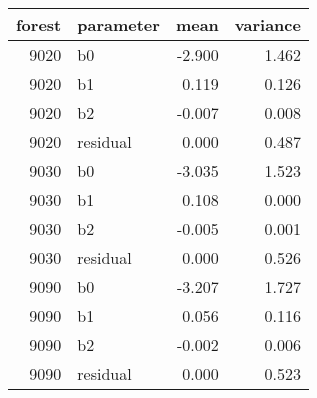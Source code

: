 \begin{table}[ht]
\begin{center}
\begin{tabular}{rlrr}
  \hline
forest & parameter & mean & variance \\ 
  \hline
9020 & b0 & -2.900 & 1.462 \\ 
  9020 & b1 & 0.119 & 0.126 \\ 
  9020 & b2 & -0.007 & 0.008 \\ 
  9020 & residual & 0.000 & 0.487 \\ 
  9030 & b0 & -3.035 & 1.523 \\ 
  9030 & b1 & 0.108 & 0.000 \\ 
  9030 & b2 & -0.005 & 0.001 \\ 
  9030 & residual & 0.000 & 0.526 \\ 
  9090 & b0 & -3.207 & 1.727 \\ 
  9090 & b1 & 0.056 & 0.116 \\ 
  9090 & b2 & -0.002 & 0.006 \\ 
  9090 & residual & 0.000 & 0.523 \\ 
   \hline
\end{tabular}
\end{center}
\end{table}
